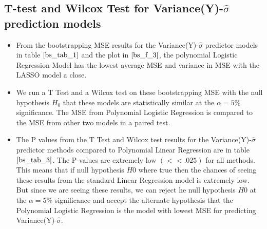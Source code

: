 \documentclass[twoside,12pt]{article}
\begin{document}
\subsection{T-test and Wilcox Test for Variance(Y)-$\hat{\sigma}$ prediction models}
\begin{itemize}
	\item
	From the bootstrapping MSE results for the Variance(Y)-$\hat{\sigma}$ predictor models in table $\eqref{bs_tab_1}$ and the plot in $\eqref{bs_f_3}$, the polynomial Logistic Regression Model has the lowest average MSE and variance in MSE with the LASSO model a close.
	\item
	We run a T Test and a Wilcox test on these bootstrapping MSE with the null hypothesis $H_0$ that these models are statistically similar at the $\alpha = 5\%$ significance. The MSE from Polynomial Logistic Regression is compared to the MSE from other two models in a paired test.
	\FloatBarrier
	\item
	The P values from the T Test and Wilcox test results for the Variance(Y)-$\hat{\sigma}$ predictor methods compared to Polynomial Linear Regression are in table $\eqref{bs_tab_3}$. The P-values are extremely low $(<<.025)$ for all methods. This means that if null hypothesis $H0$ where true then the chances of seeing these results from the standard Linear Regression model is extremely low. But since we are seeing these results, we can reject he null hypothesis $H0$ at the $\alpha = 5\%$ significance and accept the alternate hypothesis that the Polynomial Logistic Regression is the model with lowest MSE for predicting Variance(Y)-$\hat{\sigma}$.
	\begin{table}[h]
		\centering
		\caption[]{T-test and Wilcox Test on Bootstrapping Results - P-Value  Variance(Y)-$\hat{\sigma}$ for models Vs Polynomial Logistic Regression}
		\label{bs_tab_3}
	\end{table}
	
\end{itemize}
\end{document}
